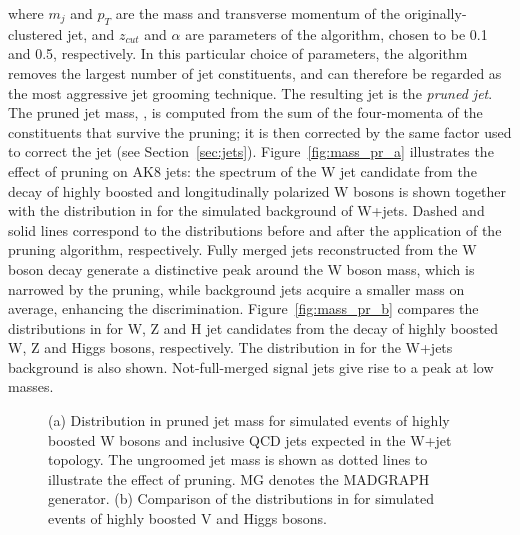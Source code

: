 where $m_j$ and $p_T$ are the mass and transverse momentum of the originally-clustered jet, and $z_{cut}$ and $\alpha$ are parameters of the algorithm, chosen to be 0.1 and 0.5, respectively. In this particular choice of parameters, the algorithm removes the largest number of jet constituents, and can therefore be regarded as the most aggressive jet grooming technique. The resulting jet is the \emph{pruned jet}. The pruned jet mass, \mJ, is computed from the sum of the four-momenta of the constituents that survive the pruning; it is then corrected by the same factor used to correct the jet \pt (see Section~\ref{sec:jets}).
Figure~\ref{fig:mass_pr_a} illustrates the effect of pruning on AK8 jets: the \mJ spectrum of the W jet candidate from the decay of highly boosted and longitudinally polarized W bosons is shown together with the distribution in \mJ for the simulated background of W+jets. Dashed and solid lines correspond to the distributions before and after the application of the pruning algorithm, respectively. Fully merged jets reconstructed from the W boson decay generate a distinctive peak around the W boson mass, which is narrowed by the pruning, while background jets acquire a smaller mass on average, enhancing the discrimination. Figure~\ref{fig:mass_pr_b} compares the distributions in \mJ for W, Z and H jet candidates from the decay of highly boosted W, Z and Higgs bosons, respectively. The distribution in \mJ for the W+jets background is also shown. Not-full-merged signal jets give rise to a peak at low masses. 

\begin{figure}[!htb]
\centering     %
{}
\caption{(a) Distribution in pruned jet mass \mJ for simulated events of highly boosted W bosons and inclusive QCD jets expected in the W+jet topology. The ungroomed jet mass is shown as dotted lines to illustrate the effect of pruning. MG denotes the MADGRAPH generator. (b) Comparison of the distributions in \mJ for simulated events of highly boosted V and Higgs bosons.}
\label{fig:mass_pr}
\end{figure}
 

